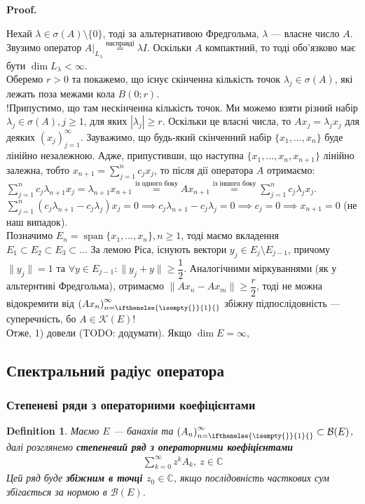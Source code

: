\documentclass[a4paper, 10pt]{article}
\makeatletter
\theoremstyle{theoremdd}
\theoremstyle{theoremdd}
\newtheorem{definition}[theorem]{Definition}
\theoremstyle{theoremdd}
\theoremstyle{theoremdd}
\theoremstyle{theoremdd}
\theoremstyle{theoremdd}
\theoremstyle{theoremdd}
\theoremstyle{theoremdd}
\newcommand{\sequence}[2][]{\left({#2}\right)_{n=\ifthenelse{\isempty{#1}}{1}{#1}}^{\infty}}
\renewenvironment{proof}[1][Proof.\\]{\par
\pushQED{\hfill \qed}%
\normalfont \topsep6\p@\@plus6\p@\relax
\trivlist
\item\relax
{\bfseries
#1\@addpunct{.}}\hspace\labelsep\ignorespaces
}{%
\popQED\endtrivlist\@endpefalse
}
\DeclareMathOperator{\linspan}{span}
\makeatother
\begin{document}
\begin{proof}
Нехай $\lambda \in \sigma(A) \setminus \{0\}$, тоді за альтернативою Фредгольма, $\lambda$ --- власне число $A$. Звузимо оператор $A|_{L_\lambda} \overset{\text{насправді}}{=} \lambda I$. Оскільки $A$ компактний, то тоді обо'язково має бути $\dim L_\lambda < \infty$.
\bigskip \\
Оберемо $r > 0$ та покажемо, що існує скінченна кількість точок $\lambda_j \in \sigma(A)$, які лежать поза межами кола $B(0;r)$.\\
!Припустимо, що там нескінченна кількість точок. Ми можемо взяти різний набір $\lambda_j \in \sigma(A), j \geq 1$, для яких $|\lambda_j| \geq r$. Оскільки це власні числа, то $Ax_j = \lambda_j x_j$ для деяких $(x_j)_{j=1}^\infty$. Зауважимо, що будь-який скінченний набір $\{x_1,\dots,x_n\}$ буде лінійно незалежною. Адже, припустивши, що наступна $\{x_1,\dots,x_n,x_{n+1}\}$ лінійно залежна, тобто $x_{n+1} = \displaystyle\sum_{j=1}^n c_j x_j$, то після дії оператора $A$ отримаємо:\\
$\displaystyle \sum_{j=1}^n c_j \lambda_{n+1} x_j = \lambda_{n+1} x_{n+1} \overset{\text{із одного боку}}{=} Ax_{n+1} \overset{\text{із іншого боку}}{=} \sum_{j=1}^n c_j \lambda_j x_j$.\\
$\displaystyle\sum_{j=1}^n (c_j \lambda_{n+1} - c_j \lambda_j) x_j = 0 \implies c_j \lambda_{n+1} - c_j \lambda_j = 0 \implies c_j = 0 \implies x_{n+1} = 0$ (не наш випадок).\\
Позначимо $E_n = \linspan\{x_1,\dots,x_n\}, n \geq 1$, тоді маємо вкладення $E_1 \subset E_2 \subset E_3 \subset \dots$ За лемою Ріса, існують вектори $y_j \in E_j \setminus E_{j-1}$, причому $\|y_j\|= 1$ та $\forall y \in E_{j-1}: \|y_j + y\| \geq \dfrac{1}{2}$. Аналогічними міркуваннями (як у альтернтиві Фредгольма), отримаємо $\|Ax_n - Ax_m\| \geq \dfrac{r}{2}$, тоді не можна відокремити від $\sequence{Ax_n}$ збіжну підпослідовність --- суперечність, бо $A \in \mathcal{K}(E)$!\\
Отже, 1) довели (TODO: додумати). Якщо $\dim E = \infty$, 
\end{proof}

\subsection{Спектральний радіус оператора}
\subsubsection{Степеневі ряди з операторними коефіцієнтами}
\begin{definition}
Маємо $E$ --- банахів та $\sequence{A_n} \subset \mathcal{B}(E)$,  далі розглянемо \textbf{степеневий ряд з операторними коефіцієнтами}
\begin{align*}
\sum_{k=0}^\infty z^k A_k,\ z \in \mathbb{C}
\end{align*}
Цей ряд буде \textbf{збіжним в точці $z_0 \in \mathbb{C}$}, якщо послідовність часткових сум збігається за нормою в $\mathcal{B}(E)$.
\end{definition}
\end{document}
